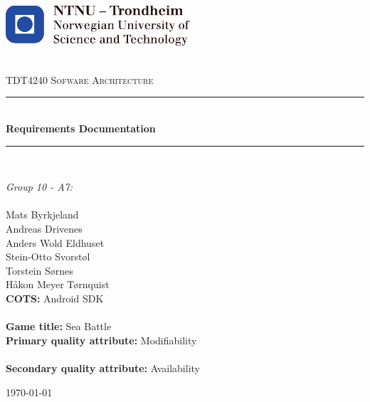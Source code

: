 \begin{titlepage}
\centering
\includegraphics[height=1.5cm]{figs/ntnu_logo.pdf}\\[1cm]
\begin{center}

\newcommand{\myauthor}{Mats Byrkjeland\\Andreas Drivenes\\Anders Wold Eldhuset\\Stein-Otto Svorstøl\\Torstein Sørnes\\Håkon Meyer Tørnquist} 
\newcommand{\mytitle}{Requirements Documentation}
\newcommand{\mygroupnumber}{10 - A7}

~\\[1.5cm]

\textsc{\Large TDT4240 Sofware Architecture}\\[0.5cm]

\hrule ~\\[0.2cm]
{\huge \bfseries \mytitle}\\[0.4cm]		%
\hrule ~\\[1.5cm]

\begin{minipage}{0.4\textwidth}
    \centering
	\large
		\emph{Group \mygroupnumber:}\\~\\
		\myauthor\\
		\vspace{2.5cm}
		\textbf{COTS:} Android SDK\\~\\
		\textbf{Game title:} Sea Battle\\
		\vspace{1.5cm}
		\textbf{Primary quality attribute:} Modifiability\\~\\
		\textbf{Secondary quality attribute:} Availability
\end{minipage}

\vfill

{\large \today}

\end{center}
\end{titlepage}


\thispagestyle{empty}